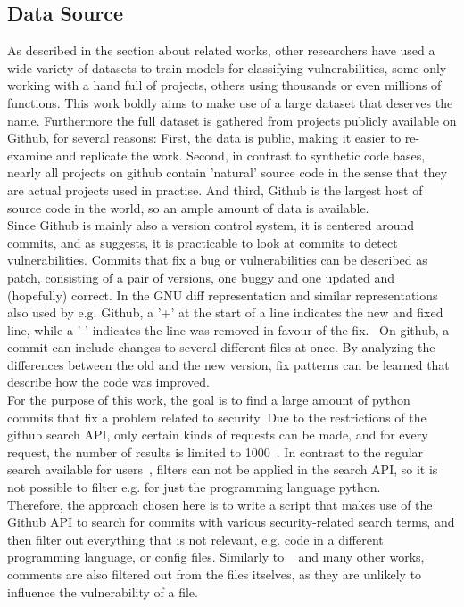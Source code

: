 \documentclass[
	a4paper,
	pagesize,
	pdftex,
	12pt,
	twoside, %
	BCOR=5mm, %
	ngerman,
	fleqn,
	final,
	]{scrartcl}
\begin{document}
\subsection{Data Source}\label{diff}
As described in the section about related works, other researchers have used a wide variety of datasets to train models for classifying vulnerabilities, some only working with a hand full of projects, others using thousands or even millions of functions. This work boldly aims to make use of a large dataset that deserves the name. Furthermore the full dataset is gathered from projects publicly available on Github, for several reasons: First, the data is public, making it easier to re-examine and replicate the work. Second, in contrast to synthetic code bases, nearly all projects on github contain 'natural' source code in the sense that they are actual projects used in practise. And third, Github is the largest host of source code in the world, so an ample amount of data is available.\\
Since Github is mainly also a version control system, it is centered around commits, and as \cite{Zhou.2017} suggests, it is practicable to look at commits to detect vulnerabilities. Commits that fix a bug or vulnerabilities can be described as patch, consisting of a pair of versions, one buggy and one updated and (hopefully) correct. In the GNU diff representation and similar representations also used by e.g. Github, a '+' at the start of a line indicates the new and fixed line, while a '-' indicates the line was removed in favour of the fix.~\cite{Liu.2018} On github, a commit can include changes to several different files at once. By analyzing the differences between the old and the new version, fix patterns can be learned that describe how the code was improved. \\
For the purpose of this work, the goal is to find a large amount of python commits that fix a problem related to security. Due to the restrictions of the github search API, only certain kinds of requests can be made, and for every request, the number of results is limited to 1000~\cite{Github.com.2}. In contrast to the regular search available for users~\cite{Github.com.2019}, filters can not be applied in the search API, so it is not possible to filter e.g. for just the programming language python.\\
Therefore, the approach chosen here is to write a script that makes use of the Github API to search for commits with various security-related search terms, and then filter out everything that is not relevant, e.g. code in a different programming language, or config files. Similarly to ~\cite{Hovsepyan.2012} and many other works, comments are also filtered out from the files itselves, as they are unlikely to influence the vulnerability of a file.\\
\end{document}
